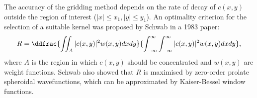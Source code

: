 The accuracy of the gridding method depends on the rate of decay of $c(x,y)$ outside the region of interest ($|x| \leq x_1, |y| \leq y_1$). An optimality criterion for the selection of a suitable kernel was proposed by Schwab in a 1983 paper:
\begin{equation}
R  = \ddfrac{\iint_A |c(x,y)|^2 w(x,y) dx dy}{\int_{-\infty}^{\infty} \int_{-\infty}^{\infty} |c(x,y)|^2 w(x,y) dx dy},
\end{equation}
where $A$ is the region in which $c(x,y)$ should be concentrated and $w(x,y)$ are weight functions. Schwab also showed that $R$ is maximised by zero-order prolate spheroidal wavefunctions, which can be approximated by Kaiser-Bessel window functions.

